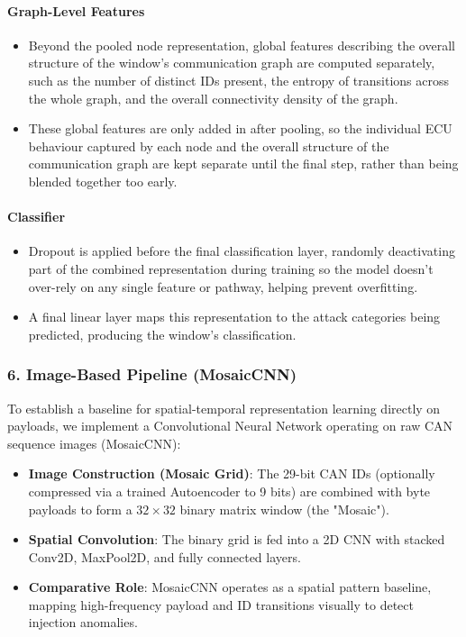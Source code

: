\documentclass{article}
\begin{document}
\paragraph{Graph-Level Features}
\begin{itemize}[noitemsep]
    \item Beyond the pooled node representation, global features describing the overall structure of the window's communication graph are computed separately, such as the number of distinct IDs present, the entropy of transitions across the whole graph, and the overall connectivity density of the graph.
    \item These global features are only added in after pooling, so the individual ECU behaviour captured by each node and the overall structure of the communication graph are kept separate until the final step, rather than being blended together too early.
\end{itemize}

\paragraph{Classifier}
\begin{itemize}[noitemsep]
    \item Dropout is applied before the final classification layer, randomly deactivating part of the combined representation during training so the model doesn't over-rely on any single feature or pathway, helping prevent overfitting.
    \item A final linear layer maps this representation to the attack categories being predicted, producing the window's classification.
\end{itemize}

\subsubsection{6. Image-Based Pipeline (MosaicCNN)}
To establish a baseline for spatial-temporal representation learning directly on payloads, we implement a Convolutional Neural Network operating on raw CAN sequence images (MosaicCNN):
\begin{itemize}[noitemsep]
    \item \textbf{Image Construction (Mosaic Grid)}: The 29-bit CAN IDs (optionally compressed via a trained Autoencoder to 9 bits) are combined with byte payloads to form a $32 \times 32$ binary matrix window (the "Mosaic").
    \item \textbf{Spatial Convolution}: The binary grid is fed into a 2D CNN with stacked Conv2D, MaxPool2D, and fully connected layers.
    \item \textbf{Comparative Role}: MosaicCNN operates as a spatial pattern baseline, mapping high-frequency payload and ID transitions visually to detect injection anomalies.
\end{itemize}
\end{document}
